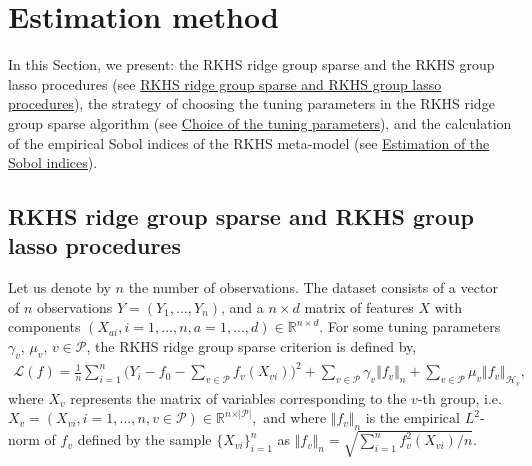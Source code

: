 \section{Estimation method}\label{sec:Description}
In this Section, we present: the RKHS ridge group sparse and the RKHS group lasso procedures (see \hyperref[subsec:RGS]{RKHS ridge group sparse and RKHS group lasso procedures}), 
the strategy of choosing the tuning parameters in the RKHS ridge group sparse algorithm (see \hyperref[subsec:Err]{Choice of the tuning parameters}), and the calculation of the empirical Sobol indices of the RKHS meta-model (see \hyperref[subsec:SI]{Estimation of the Sobol indices}).
\subsection{RKHS ridge group sparse and RKHS group lasso procedures}\label{subsec:RGS}
Let us denote by $n$ the number of observations. The dataset consists of a vector of $n$ observations $Y=(Y_1,...,Y_n)$, and a $n\times d$ matrix of features $X$ with components $(X_{ai},i=1,...,n,a=1,...,d)\in\mathbb{R}^{n\times d}.$ 
For some tuning parameters $\gamma_v$, $\mu_v$, $v\in\mathcal{P}$, the RKHS ridge group sparse criterion is defined by, 
\begin{align}
\label{functional}
\mathcal{L}(f)=\frac{1}{n}\sum_{i=1}^n\Big(Y_i-f_0-\sum_{v\in\mathcal{P}}f_v(X_{vi}) \Big)^2
+\sum_{v\in\mathcal{P}}\gamma_v\Vert f_v\Vert_n+\sum_{v\in\mathcal{P}}\mu_v\Vert f_v\Vert_{\mathcal{H}_v} ,
\end{align}
where $X_v$ represents the matrix of variables corresponding to the $v$-th group, i.e. $X_v=(X_{vi},i=1,...,n,v\in\mathcal{P})\in\mathbb{R}^{n\times \vert \mathcal{P}\vert},$ 
and where $\Vert f_v\Vert_n$ is the empirical $L^2$-norm of $f_v$ defined by the sample $\{X_{vi}\}_{i=1}^n$ as $\Vert f_v\Vert_n=\sqrt{\sum_{i=1}^nf_v^2(X_{vi})/n}.$

